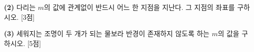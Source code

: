\documentclass[10pt]{article}
\begin{document}
\begin{pagepair}
{\textbf{(2)} 다리는 $m$의 값에 관계없이 반드시 어느 한 지점을 지난다. 그 지점의 좌표를 구하시오. [3점]
\vfill

\textbf{(3)} 세워지는 조명이 두 개가 되는 물보라 반경이 존재하지 않도록 하는 $m$의 값을 구하시오. [5점]
\vspace*{-13.5mm}
\vfill\null
}
\end{pagepair}
\end{document}
